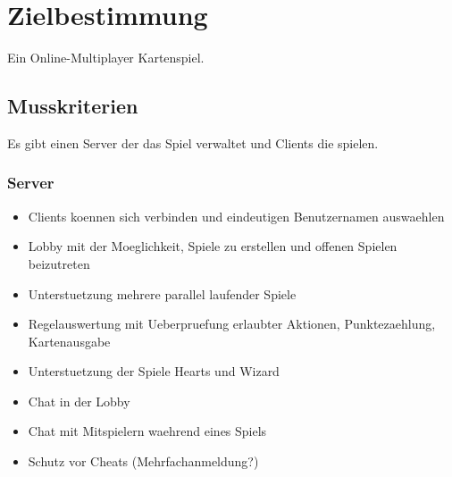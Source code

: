 \documentclass{article}
\begin{document}
\tableofcontents
\newpage

\section{Zielbestimmung}
Ein Online-Multiplayer Kartenspiel.

\subsection{Musskriterien}
Es gibt einen Server der das Spiel verwaltet und Clients die spielen.
\subsubsection{Server}
\begin{itemize}
	\item Clients koennen sich verbinden und eindeutigen Benutzernamen auswaehlen
	\item Lobby mit der Moeglichkeit, Spiele zu erstellen und offenen Spielen beizutreten
	\item Unterstuetzung mehrere parallel laufender Spiele
	\item Regelauswertung mit Ueberpruefung erlaubter Aktionen, Punktezaehlung, Kartenausgabe
	\item Unterstuetzung der Spiele Hearts und Wizard
	\item Chat in der Lobby
	\item Chat mit Mitspielern waehrend eines Spiels
	\item Schutz vor Cheats (Mehrfachanmeldung?)
\end{itemize}
\end{document}
